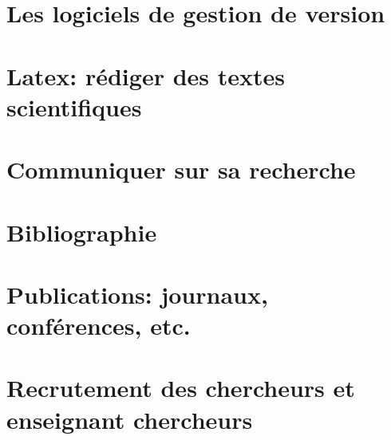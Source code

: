 \documentclass[a4paper,10pt]{book_ad}
\begin{document}
\chapter{Les logiciels de gestion de version}
\minitoc



\chapter{Latex: rédiger des textes scientifiques}
\minitoc



\chapter{Communiquer sur sa recherche}
\minitoc



\chapter{Bibliographie}
\minitoc



\chapter{Publications: journaux, conférences, etc.}
\minitoc



\chapter{Recrutement des chercheurs et enseignant chercheurs}
\minitoc

\end{document}
